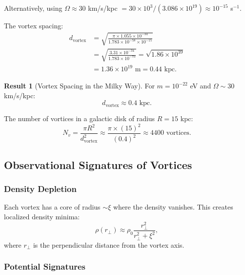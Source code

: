 \documentclass[11pt,a4paper]{article}
\theoremstyle{definition}
\newtheorem{result}{Result}
\theoremstyle{remark}
\begin{document}
Alternatively, using $\Omega \approx 30$ km/s/kpc $= 30 \times 10^3 / (3.086 \times 10^{19}) \approx 10^{-15}$ s$^{-1}$.

The vortex spacing:
\begin{align}
d_{\mathrm{vortex}} &= \sqrt{\frac{\pi \times 1.055 \times 10^{-34}}{1.783 \times 10^{-58} \times 10^{-15}}} \\
&= \sqrt{\frac{3.31 \times 10^{-34}}{1.783 \times 10^{-73}}} = \sqrt{1.86 \times 10^{39}} \\
&= 1.36 \times 10^{19} \text{ m} = 0.44 \text{ kpc}.
\end{align}

\begin{result}[Vortex Spacing in the Milky Way]
For $m = 10^{-22}$ eV and $\Omega \sim 30$ km/s/kpc:
\begin{equation}
\boxed{d_{\mathrm{vortex}} \approx 0.4 \text{ kpc}.}
\end{equation}

The number of vortices in a galactic disk of radius $R = 15$ kpc:
\begin{equation}
N_v = \frac{\pi R^2}{d_{\mathrm{vortex}}^2} \approx \frac{\pi \times (15)^2}{(0.4)^2} \approx 4400 \text{ vortices}.
\end{equation}
\end{result}

\subsection{Observational Signatures of Vortices}
\label{sec:vortex_signatures}

\subsubsection{Density Depletion}

Each vortex has a core of radius $\sim \xi$ where the density vanishes. This creates localized density minima:
\begin{equation}
\rho(r_\perp) \approx \rho_0 \frac{r_\perp^2}{r_\perp^2 + \xi^2},
\end{equation}
where $r_\perp$ is the perpendicular distance from the vortex axis.

\subsubsection{Potential Signatures}
\end{document}
